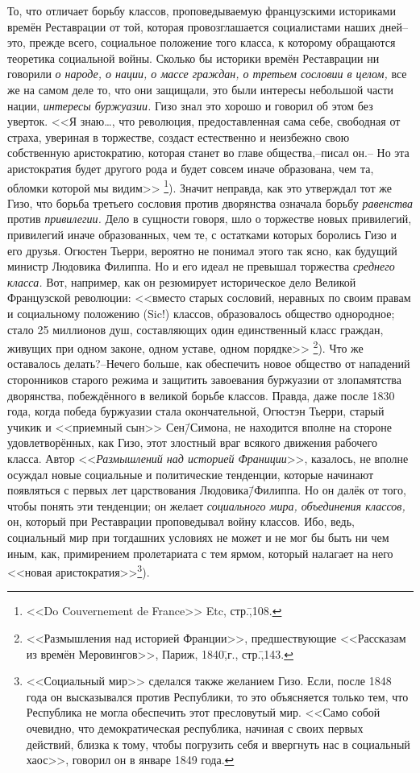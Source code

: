 То, что отличает борьбу классов, проповедываемую французскими историками времён Реставрации от той, которая провозглашается социалистами наших дней\---это, прежде всего, социальное положение того класса, к которому обращаются теоретика социальной войны. Сколько бы историки времён Реставрации ни говорили \emph{о народе, о нации, о массе граждан, о третьем сословии в целом,} все же на самом деле то, что они защищали, это были интересы небольшой части нации, \emph{интересы буржуазии.} Гизо знал это хорошо и говорил об этом без уверток. <<Я знаю\dots, что революция, предоставленная сама себе, свободная от страха, увериная в торжестве, создаст естественно и неизбежно свою собственную аристократию, которая станет во главе общества,\---писал он.\--- Но эта аристократия будет другого рода и будет совсем иначе образована, чем та, обломки которой мы видим>> \footnote{<<Do Couvernement de France>> Etc, стр.\=,108.}). Значит неправда, как это утверждал тот же Гизо, что борьба третьего сословия против дворянства означала борьбу \emph{равенства} против \emph{привилегии.} Дело в сущности говоря, шло о торжестве новых привилегий, привилегий иначе образованных, чем те, с остатками которых боролись Гизо и его друзья. Огюстен Тьерри, вероятно не понимал этого так ясно, как будущий министр Людовика Филиппа. Но и его идеал не превышал торжества \emph{среднего класса.} Вот, например, как он резюмирует историческое дело Великой Французской революции: <<вместо старых сословий, неравных по своим правам и социальному положению (Sic!) классов, образовалось общество однородное; стало 25 миллионов душ, составляющих один единственный класс граждан, живущих при одном законе, одном уставе, одном порядке>> \footnote{<<Размышления над историей Франции>>, предшествующие <<Рассказам из времён Меровингов>>, Париж, 1840\=,г., стр.\=,143.}). Что же оставалось делать?\---Нечего больше, как обеспечить новое общество от нападений сторонников старого режима и защитить завоевания буржуазии от злопамятства дворянства, побеждённого в великой борьбе классов. Правда, даже после 1830 года, когда победа буржуазии стала окончательной, Огюстэн Тьерри, старый учикик и <<приемный сын>> Сен\=/Симона, не находится вполне на стороне удовлетворённых, как Гизо, этот злостный враг всякого движения рабочего класса. Автор <<\emph{Размышлений над историей Франиции}>>, казалось, не вполне осуждал новые социальные и политические тенденции, которые начинают появляться с первых лет царствования Людовика\=/Филиппа. Но он далёк от того, чтобы понять эти тенденции; он желает \emph{социального мира, объединения классов,} он, который при Реставрации проповедывал войну классов. Ибо, ведь, социальный мир при тогдашних условиях не может и не мог бы быть ни чем иным, как, примирением пролетариата с тем ярмом, который налагает на него <<новая аристократия>>\footnote{<<Социальный мир>> сделался также желанием Гизо. Если, после 1848 года он высказывался против Республики, то это объясняется только тем, что Республика не могла обеспечить этот пресловутый мир. <<Само собой очевидно, что демократическая республика, начиная с своих первых действий, близка к тому, чтобы погрузить себя и ввергнуть нас в социальный хаос>>, говорил он в январе 1849 года.}).


